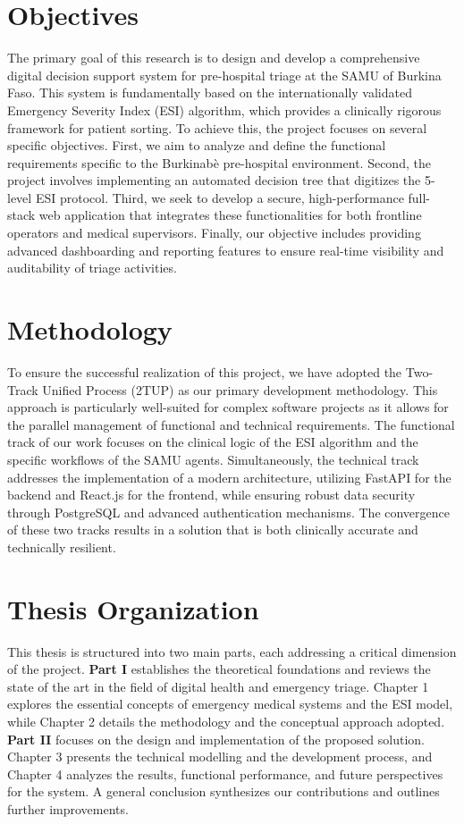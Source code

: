 \section*{Objectives}
The primary goal of this research is to design and develop a comprehensive digital decision support system for pre-hospital triage at the SAMU of Burkina Faso. This system is fundamentally based on the internationally validated Emergency Severity Index (ESI) algorithm, which provides a clinically rigorous framework for patient sorting. To achieve this, the project focuses on several specific objectives. First, we aim to analyze and define the functional requirements specific to the Burkinab\`e pre-hospital environment. Second, the project involves implementing an automated decision tree that digitizes the 5-level ESI protocol. Third, we seek to develop a secure, high-performance full-stack web application that integrates these functionalities for both frontline operators and medical supervisors. Finally, our objective includes providing advanced dashboarding and reporting features to ensure real-time visibility and auditability of triage activities.

\section*{Methodology}
To ensure the successful realization of this project, we have adopted the Two-Track Unified Process (2TUP) as our primary development methodology. This approach is particularly well-suited for complex software projects as it allows for the parallel management of functional and technical requirements. The functional track of our work focuses on the clinical logic of the ESI algorithm and the specific workflows of the SAMU agents. Simultaneously, the technical track addresses the implementation of a modern architecture, utilizing FastAPI for the backend and React.js for the frontend, while ensuring robust data security through PostgreSQL and advanced authentication mechanisms. The convergence of these two tracks results in a solution that is both clinically accurate and technically resilient.

\section*{Thesis Organization}
This thesis is structured into two main parts, each addressing a critical dimension of the project. \textbf{Part I} establishes the theoretical foundations and reviews the state of the art in the field of digital health and emergency triage. Chapter 1 explores the essential concepts of emergency medical systems and the ESI model, while Chapter 2 details the methodology and the conceptual approach adopted. \textbf{Part II} focuses on the design and implementation of the proposed solution. Chapter 3 presents the technical modelling and the development process, and Chapter 4 analyzes the results, functional performance, and future perspectives for the system. A general conclusion synthesizes our contributions and outlines further improvements.

\clearpage
